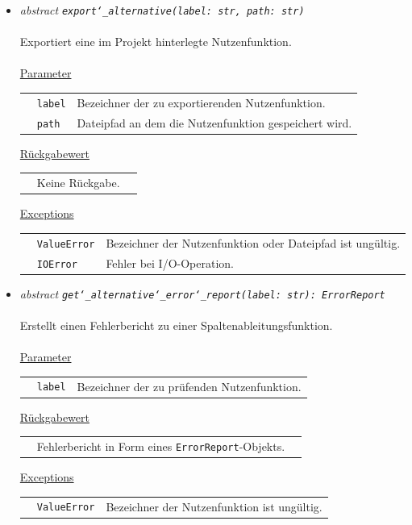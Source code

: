 \documentclass{article}
\begin{document}
\begin{itemize}
\begin{itemize}
\item \textit{\flqq{}abstract\frqq} \texttt{\textit{export\char`_alternative(label: str, path: str)}}\\\\
Exportiert eine im Projekt hinterlegte Nutzenfunktion.
\\\\
\underline{Parameter}\\
\begin{tabular}{lll}
 & \texttt{label} & Bezeichner der zu exportierenden Nutzenfunktion.\\
 & \texttt{path} & Dateipfad an dem die Nutzenfunktion gespeichert wird.\\
\end{tabular}

\underline{Rückgabewert}\\
\begin{tabular}{lll}
 & Keine Rückgabe.\\
\end{tabular}

\underline{Exceptions}\\
\begin{tabular}{lll}
 & \texttt{ValueError} & Bezeichner der Nutzenfunktion oder Dateipfad ist ungültig.\\
 & \texttt{IOError} & Fehler bei I/O-Operation.\\
\end{tabular}


\item \textit{\flqq{}abstract\frqq} \texttt{\textit{get\char`_alternative\char`_error\char`_report(label: str): ErrorReport}}\\\\
Erstellt einen Fehlerbericht zu einer Spaltenableitungsfunktion.
\\\\
\underline{Parameter}\\
\begin{tabular}{lll}
 & \texttt{label} & Bezeichner der zu prüfenden Nutzenfunktion.\\
\end{tabular}

\underline{Rückgabewert}\\
\begin{tabular}{lll}
 & Fehlerbericht in Form eines \texttt{ErrorReport}-Objekts.\\
\end{tabular}

\underline{Exceptions}\\
\begin{tabular}{lll}
 & \texttt{ValueError} & Bezeichner der Nutzenfunktion ist ungültig.\\
\end{tabular}



\end{itemize}
\end{itemize}
\end{document}
